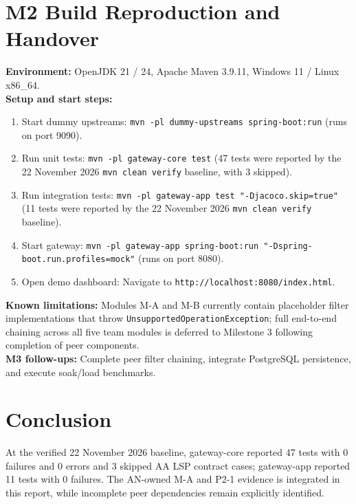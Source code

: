 \documentclass[12pt,a4paper]{article}
\begin{document}
\section{M2 Build Reproduction and Handover}
\textbf{Environment:} OpenJDK 21 / 24, Apache Maven 3.9.11, Windows 11 / Linux x86\_64.\\
\textbf{Setup and start steps:}
\begin{enumerate}[leftmargin=*]
\item Start dummy upstreams: \texttt{mvn -pl dummy-upstreams spring-boot:run} (runs on port 9090).
\item Run unit tests: \texttt{mvn -pl gateway-core test} (47 tests were reported by the 22 November 2026 \texttt{mvn clean verify} baseline, with 3 skipped).
\item Run integration tests: \texttt{mvn -pl gateway-app test "-Djacoco.skip=true"} (11 tests were reported by the 22 November 2026 \texttt{mvn clean verify} baseline).
\item Start gateway: \texttt{mvn -pl gateway-app spring-boot:run "-Dspring-boot.run.profiles=mock"} (runs on port 8080).
\item Open demo dashboard: Navigate to \texttt{http://localhost:8080/index.html}.
\end{enumerate}
\textbf{Known limitations:} Modules M-A and M-B currently contain placeholder filter implementations that throw \texttt{UnsupportedOperationException}; full end-to-end chaining across all five team modules is deferred to Milestone 3 following completion of peer components.\\
\textbf{M3 follow-ups:} Complete peer filter chaining, integrate PostgreSQL persistence, and execute soak/load benchmarks.

\section*{Conclusion}
At the verified 22 November 2026 baseline, gateway-core reported 47 tests with 0 failures and 0 errors and 3 skipped AA LSP contract cases; gateway-app reported 11 tests with 0 failures. The AN-owned M-A and P2-1 evidence is integrated in this report, while incomplete peer dependencies remain explicitly identified.
\end{document}
